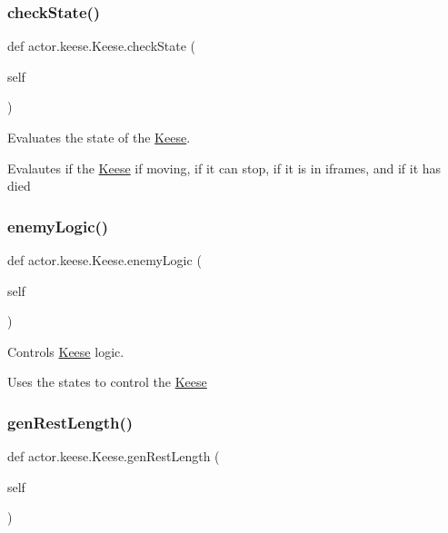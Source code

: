 \subsubsection{\texorpdfstring{check\+State()}{checkState()}}
{\footnotesize\ttfamily def actor.\+keese.\+Keese.\+check\+State (\begin{DoxyParamCaption}\item[{}]{self }\end{DoxyParamCaption})}



Evaluates the state of the \hyperlink{classactor_1_1keese_1_1_keese}{Keese}. 

Evalautes if the \hyperlink{classactor_1_1keese_1_1_keese}{Keese} if moving, if it can stop, if it is in iframes, and if it has died \mbox{\label{classactor_1_1keese_1_1_keese_a838343717716ba48c0519e73d702cac9}} 
\subsubsection{\texorpdfstring{enemy\+Logic()}{enemyLogic()}}
{\footnotesize\ttfamily def actor.\+keese.\+Keese.\+enemy\+Logic (\begin{DoxyParamCaption}\item[{}]{self }\end{DoxyParamCaption})}



Controls \hyperlink{classactor_1_1keese_1_1_keese}{Keese} logic. 

Uses the states to control the \hyperlink{classactor_1_1keese_1_1_keese}{Keese} \mbox{\label{classactor_1_1keese_1_1_keese_ad69c85211ff8008fd3c223296dc16af7}} 
\subsubsection{\texorpdfstring{gen\+Rest\+Length()}{genRestLength()}}
{\footnotesize\ttfamily def actor.\+keese.\+Keese.\+gen\+Rest\+Length (\begin{DoxyParamCaption}\item[{}]{self }\end{DoxyParamCaption})}



